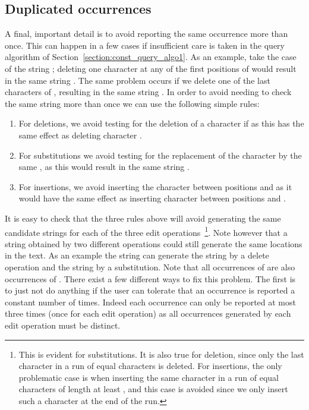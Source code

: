 \documentclass{article}
\newcommand{\?}{\mskip1.5mu}
\begin{document}
\subsection{Duplicated occurrences}
\label{subsec:dupl_occ}
A final, important detail is to avoid reporting the same occurrence more than once. This can happen in a few cases if insufficient care is taken in the query algorithm of Section~\ref{section:const_query_algo1}. As an example, take the case of the string ; deleting one character at any of the  first positions of  would result in the same string . The same problem occurs if we delete one of the last  characters of , resulting in the same string . 
In order to avoid needing to check the same string more than once we can use the following simple rules: 
\begin{enumerate}
\item For deletions, we avoid testing for the deletion of a character  if  as this has the same effect as deleting character . 
\item For substitutions we avoid testing for the replacement of the character  by the same , as this would result in the same string . 
\item For insertions, we avoid inserting the character  between positions  and  as it would have the same effect as inserting character  between positions  and . 
\end{enumerate}
It is easy to check that the three rules above will avoid generating the same candidate strings for each of the three edit operations~\footnote{This is evident for substitutions. It is also true for deletion, since only the last character in a run of equal characters is deleted. For insertions, the only problematic case is when inserting the same character in a run of equal characters of length at least , and this case is  avoided since we only insert such a character at the end of the run.}. Note however that a string obtained by two different operations could still generate the same locations in the text. As an example the string  can generate the string  by a delete operation and the string  by a substitution. Note that all occurrences of  are also occurrences of . 
There exist a few different ways to fix this problem. The first is to just not do anything if the user can tolerate that an occurrence is reported a constant number of times. Indeed each occurrence can only be reported at most three times (once for each edit operation) as all occurrences generated by each edit operation must be distinct. 
\end{document}
